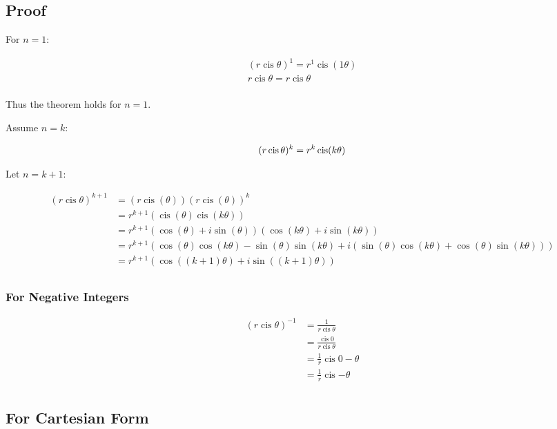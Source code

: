 \documentclass[a4paper,11pt]{article}
\DeclareMathOperator\cis{cis}
\begin{document}
\subsection{Proof}

For $n = 1$:

$$
\begin{aligned}
(r \cis{\theta})^1 = r^1 \cis(1 \theta) \\
r \cis{\theta} = r \cis{\theta} \\
\end{aligned}
$$

Thus the theorem holds for $n = 1$.

Assume $n = k$:

$$
(r \cis{\theta})^k = r^k \cis(k \theta) \\
$$

Let $n = k + 1$:

$$
\begin{aligned}
(r \cis{\theta})^{k + 1} & = (r \cis(\theta))(r \cis(\theta))^k \\
& = r^{k + 1} (\cis(\theta) \cis(k \theta)) \\
& = r^{k + 1} (\cos(\theta) + i \sin(\theta))(\cos(k \theta) + i \sin(k \theta)) \\
& = r^{k + 1} (\cos(\theta) \cos(k \theta) - \sin(\theta) \sin(k \theta) + i(\sin(\theta) \cos(k \theta) + \cos(\theta) \sin(k \theta))) \\
& = r^{k + 1} (\cos((k + 1) \theta) + i \sin((k + 1) \theta)) \\
\end{aligned}
$$


\subsubsection{For Negative Integers}

$$
\begin{aligned}
(r \cis{\theta})^{-1} & = \frac{1}{r \cis{\theta}} \\
& = \frac{\cis{0}}{r \cis{\theta}} \\
& = \frac{1}{r} \cis{0 - \theta} \\
& = \frac{1}{r} \cis{-\theta} \\
\end{aligned}
$$


\subsection{For Cartesian Form}
\end{document}
